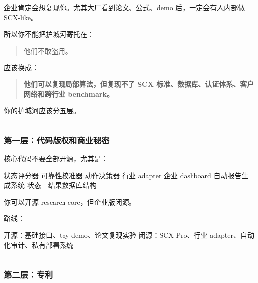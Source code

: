 \documentclass[
  12pt,
]{ctexart}
\newenvironment{Shaded}{}{}
\newcommand{\NormalTok}[1]{#1}
\begin{document}
企业肯定会想复现你。尤其大厂看到论文、公式、demo 后，一定会有人内部做
SCX-like。

所以你不能把护城河寄托在：

\begin{quote}
他们不敢盗用。
\end{quote}

应该换成：

\begin{quote}
\textbf{他们可以复现局部算法，但复现不了 SCX
标准、数据库、认证体系、客户网络和跨行业 benchmark。}
\end{quote}

你的护城河应该分五层。

\begin{center}\rule{0.5\linewidth}{0.5pt}\end{center}

\subsubsection{第一层：代码版权和商业秘密}\label{ux7b2cux4e00ux5c42ux4ee3ux7801ux7248ux6743ux548cux5546ux4e1aux79d8ux5bc6}

核心代码不要全部开源，尤其是：

\begin{Shaded}
\begin{Highlighting}[]
\NormalTok{状态评分器}
\NormalTok{可靠性校准器}
\NormalTok{动作决策器}
\NormalTok{行业 adapter}
\NormalTok{企业 dashboard}
\NormalTok{自动报告生成系统}
\NormalTok{状态—结果数据库结构}
\end{Highlighting}
\end{Shaded}

你可以开源 research core，但企业版闭源。

路线：

\begin{Shaded}
\begin{Highlighting}[]
\NormalTok{开源：基础接口、toy demo、论文复现实验}
\NormalTok{闭源：SCX{-}Pro、行业 adapter、自动化审计、私有部署系统}
\end{Highlighting}
\end{Shaded}

\begin{center}\rule{0.5\linewidth}{0.5pt}\end{center}

\subsubsection{第二层：专利}\label{ux7b2cux4e8cux5c42ux4e13ux5229}
\end{document}
